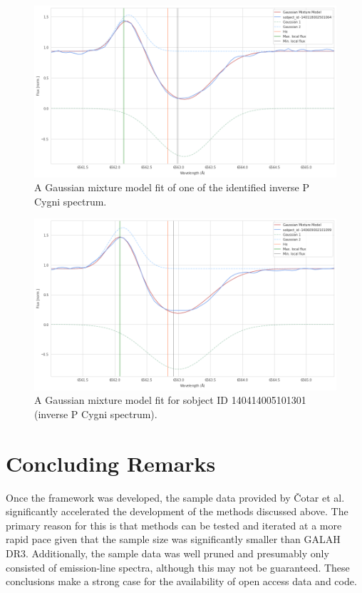 \begin{figure}[!htb]
\centering
\includegraphics[scale=0.45]{figures/inverse p cygni 1.png}
\caption{A Gaussian mixture model fit of one of the identified inverse P Cygni spectrum. }
\end{figure}

\begin{figure}[!htb]
\centering
\includegraphics[scale=0.45]{figures/inverse p cygni fitted 2.png}
\caption{A Gaussian mixture model fit for sobject ID 140414005101301 (inverse P Cygni spectrum).}
\end{figure}

\section{Concluding Remarks}

Once the framework was developed, the sample data provided by Čotar et al. significantly accelerated the development of the methods discussed above. The primary reason for this is that methods can be tested and iterated at a more rapid pace given that the sample size was significantly smaller than GALAH DR3. Additionally, the sample data was well pruned and presumably only consisted of emission-line spectra, although this may not be guaranteed. These conclusions make a strong case for the availability of open access data and code.

